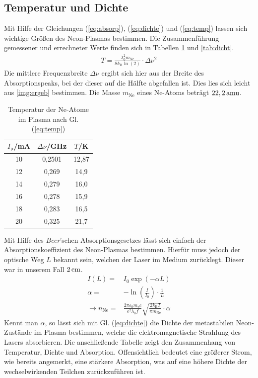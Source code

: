 \documentclass[numbers=noenddot,12pt,a4paper]{scrartcl}
\newcommand{\ix}[1]{_\text{#1}}
\newcommand{\tilt}[1]{\textit{#1}}
\begin{document}
\subsection{Temperatur und Dichte}
Mit Hilfe der Gleichungen (\ref{eq:absorp}), (\ref{eq:dichte}) und (\ref{eq:temp}) lassen sich wichtige Größen des Neon-Plasmas bestimmen. Die Zusammenführung gemessener und errechneter Werte finden sich in Tabellen \ref{tab:temp} und \ref{tab:dicht}.
\begin{align}
	T=\frac{\lambda\ix{0}^2 m\ix{Ne}}{8k\ix{B}\ln\left(2\right)} \cdot \Delta\nu^2 \label{eq:temp}
	\end{align}
Die mittlere Frequenzbreite $\Delta\nu$ ergibt sich hier aus der Breite des Absorptionspeaks, bei der dieser auf die Hälfte abgefallen ist. Dies lies sich leicht aus \ref{img:ergeb} bestimmen. Die Masse $m\ix{Ne}$ eines Ne-Atoms beträgt $\unit[22,2]{amu}$.
\begin{table}[H]
	\centering
	\begin{tabular}{c|c|c}
		$I\ix{p}$/mA & $\Delta \nu$/GHz & $T$/K \\ \hline
		10 & 0,2501 & 12,87\\
		12 & 0,269 & 14,9\\
		14 & 0,279 & 16,0 \\
		16 & 0,278 & 15,9 \\
		18 & 0,283 & 16,5 \\
		20 & 0,325 & 21,7 
	\end{tabular}
	\caption{Temperatur der Ne-Atome im Plasma nach Gl. (\ref{eq:temp})}\label{tab:temp}
\end{table}
Mit Hilfe des \tilt{Beer}'schen Absorptionsgesetzes lässt sich einfach der Absorptionskoeffizient des Neon-Plasmas bestimmen. Hierfür muss jedoch der optische Weg $L$ bekannt sein, welchen der Laser im Medium zurücklegt. Dieser war in unserem Fall $\unit[2]{cm}$.
\begin{align}
	I(L)=&I\ix{0}\exp\left(-\alpha L\right) \\
	\alpha=&-\ln\left(\frac{I}{I\ix{0}}\right)\cdot \frac{1}{L} \label{eq:absorp}\\
	\rightarrow n\ix{Ne}=&\frac{2\pi\varepsilon\ix{0}m\ix{e}c}{e^2\lambda\ix{0}\tilt{f}}\sqrt{\frac{2k\ix{B}T}{\pi m\ix{Ne}}}\cdot \alpha \label{eq:dichte}
\end{align}
Kennt man $\alpha$, so lässt sich mit Gl. (\ref{eq:dichte}) die Dichte der metastabilen Neon-Zustände im Plasma bestimmen, welche die elektromagnetische Strahlung des Lasers absorbieren. Die anschließende Tabelle zeigt den Zusammenhang von Temperatur, Dichte und Absorption. Offensichtlich bedeutet eine größerer Strom, wie bereits angemerkt, eine stärkere Absorption, was auf eine höhere Dichte der wechselwirkenden Teilchen zurückzuführen ist.
\end{document}
